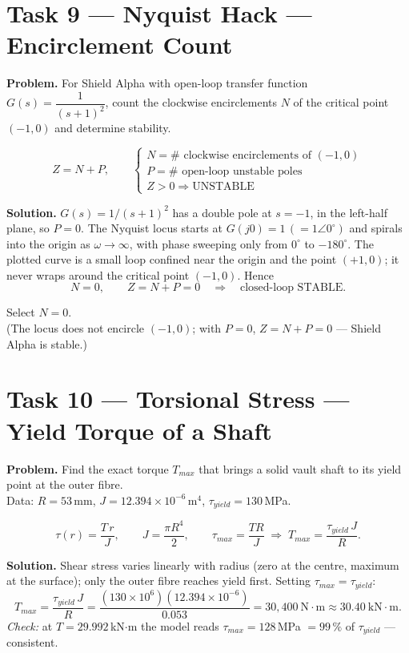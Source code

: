 \documentclass[11pt]{article}
\newcommand{\task}[2]{\section{Task #1 --- #2}}
\begin{document}
\task{9}{Nyquist Hack --- Encirclement Count}
\textbf{Problem.} For Shield Alpha with open-loop transfer function
$G(s)=\dfrac{1}{(s+1)^2}$, count the clockwise encirclements $N$ of the
critical point $(-1,0)$ and determine stability.

\begin{relbox}
\[
Z=N+P,\qquad
\begin{cases}
N=\#\text{ clockwise encirclements of }(-1,0)\\
P=\#\text{ open-loop unstable poles}\\
Z>0 \Rightarrow \text{UNSTABLE}
\end{cases}
\]
\end{relbox}

\textbf{Solution.} $G(s)=1/(s+1)^2$ has a double pole at $s=-1$, in the
left-half plane, so $P=0$. The Nyquist locus starts at
$G(j0)=1\,(=1\angle0^{\circ})$ and spirals into the origin as
$\omega\to\infty$, with phase sweeping only from $0^{\circ}$ to $-180^{\circ}$.
The plotted curve is a small loop confined near the origin and the point
$(+1,0)$; it never wraps around the critical point $(-1,0)$. Hence
\[
N=0,\qquad Z=N+P=0\quad\Rightarrow\quad\text{closed-loop STABLE}.
\]

\begin{answer}
Select \textbf{$N = 0$}.\\
(The locus does not encircle $(-1,0)$; with $P=0$, $Z=N+P=0$ --- Shield Alpha is stable.)
\end{answer}

\task{10}{Torsional Stress --- Yield Torque of a Shaft}
\textbf{Problem.} Find the exact torque $T_{max}$ that brings a solid vault
shaft to its yield point at the outer fibre.\\
Data: $R=53$\,mm, $J=12.394\times10^{-6}$\,m$^4$,
$\tau_{yield}=130$\,MPa.

\begin{relbox}
\[
\tau(r)=\frac{T\,r}{J},\qquad J=\frac{\pi R^4}{2},\qquad
\tau_{max}=\frac{T R}{J}\;\Rightarrow\;
T_{max}=\frac{\tau_{yield}\,J}{R}.
\]
\end{relbox}

\textbf{Solution.} Shear stress varies linearly with radius (zero at the
centre, maximum at the surface); only the outer fibre reaches yield first.
Setting $\tau_{max}=\tau_{yield}$:
\[
T_{max}=\frac{\tau_{yield}\,J}{R}
=\frac{(130\times10^{6})(12.394\times10^{-6})}{0.053}
=30{,}400\ \text{N}\cdot\text{m}\approx30.40\ \text{kN}\cdot\text{m}.
\]
\emph{Check:} at $T=29.992$\,kN$\cdot$m the model reads
$\tau_{max}=128$\,MPa $=99\,\%$ of $\tau_{yield}$ --- consistent.
\end{document}
